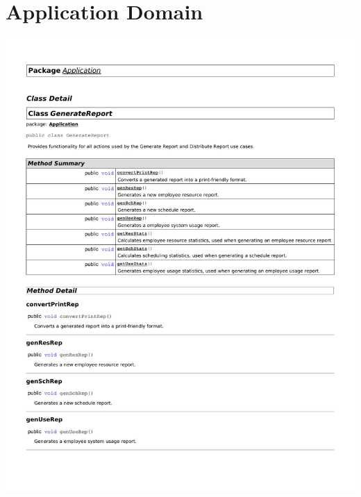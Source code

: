 \documentclass[letterpaper,12pt]{report}
\begin{document}
\section{Application Domain}

\includegraphics[scale=0.9,trim=20mm 30mm 25mm 25mm]{externals/dd1.pdf}
\newpage
\end{document}
